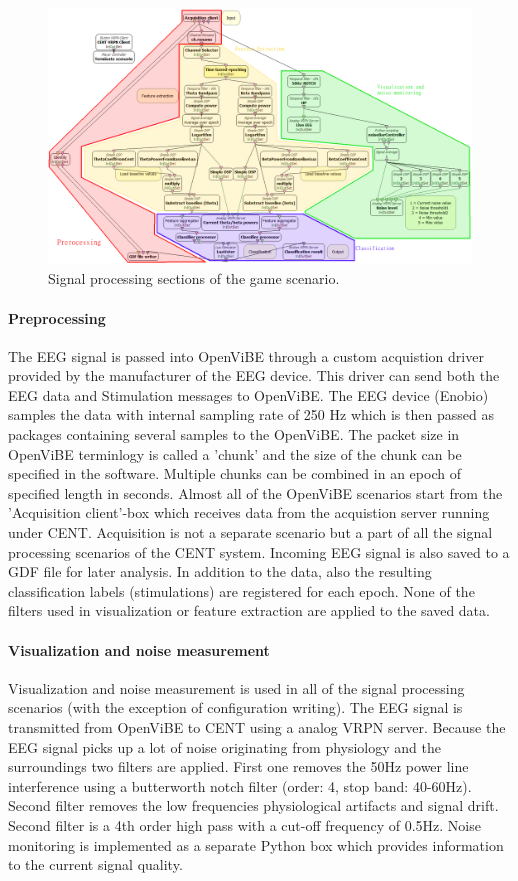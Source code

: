 \begin{figure}[h]
	\centering
	\includegraphics[scale=0.4,angle=90]{sections.png}
	\caption{Signal processing sections of the game scenario.}\label{processingsections}
\end{figure}

\paragraph{Preprocessing}
The EEG signal is passed into OpenViBE through a custom acquistion driver provided by the manufacturer of the EEG device. This driver can send both the EEG data and Stimulation messages to OpenViBE. The EEG device (Enobio) samples the data with internal sampling rate of 250 Hz which is then passed as packages containing several samples to the OpenViBE. The packet size in OpenViBE terminlogy is called a 'chunk' and the size of the chunk can be specified in the software. Multiple chunks can be combined in an epoch of specified length in seconds. Almost all of the OpenViBE scenarios start from the 'Acquisition client'-box which receives data from the acquistion server running under CENT. Acquisition is not a separate scenario but a part of all the signal processing scenarios of the CENT system. Incoming EEG signal is also saved to a GDF file for later analysis. In addition to the data, also the resulting classification labels (stimulations) are registered for each epoch. None of the filters used in visualization or feature extraction are applied to the saved data.

\paragraph{Visualization and noise measurement}
Visualization and noise measurement is used in all of the signal processing scenarios (with the exception of configuration writing). The EEG signal is transmitted from OpenViBE to CENT using a analog VRPN server. Because the EEG signal picks up a lot of noise originating from physiology and the surroundings two filters are applied. First one removes the 50Hz power line interference using a butterworth notch filter (order: 4, stop band: 40-60Hz). Second filter removes the low frequencies physiological artifacts and signal drift. Second filter is a 4th order high pass with a cut-off frequency of 0.5Hz. Noise monitoring is implemented as a separate Python box which provides information to the current signal quality.

